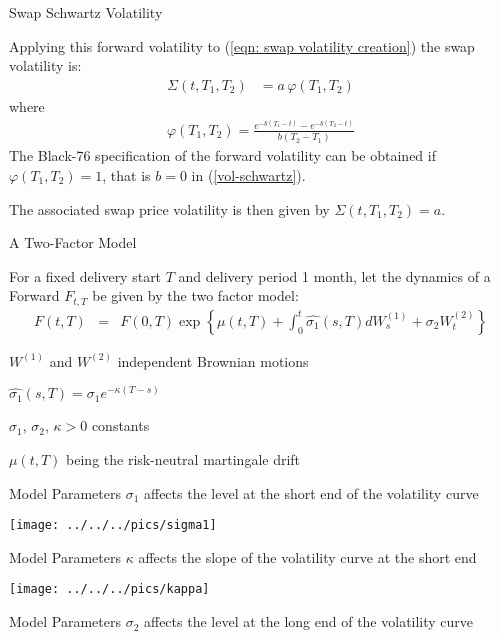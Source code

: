 

{Swap Schwartz Volatility}

Applying this forward volatility to (\ref{eqn: swap volatility creation}) the swap volatility is:
\begin{align}
\Sigma(t,T_1,T_2)&=a\,\varphi(T_1,T_2)
\end{align}
where
\begin{align}
\varphi(T_1,T_2)= \frac{e^{-b(T_1-t)}-e^{-b(T_2-t)}}{b(T_2-T_1)}
\label{volatility function varphi}
\end{align}
The Black-76 specification of the forward volatility can be obtained if $\varphi(T_1,T_2) =1$, that is $b=0$
in (\ref{vol-schwartz}).

The associated swap price volatility is then given by $\Sigma(t,T_1,T_2)=a$.

{A Two-Factor Model}


	For a fixed delivery start $T$ and delivery period 1 month, let the dynamics of a Forward $F_{t,T}$ be given by the two factor model:
\begin{eqnarray*}
F(t,T)& =&F(0,T)\exp\left\{\mu(t,T)  +\int_0^t\hat{\sigma_1}(s,T)dW_s^{(1)}+\sigma_2W_t^{(2)}\right\}
\end{eqnarray*}

	$W^{(1)}$ and $W^{(2)}$ independent Brownian motions

	$\hat{\sigma_1}(s,T)=\sigma_1e^{-\kappa(T-s)}$

	$\sigma_1$, $\sigma_2$, $\kappa>0$ constants

	$\mu(t,T)$ being the risk-neutral martingale drift


{Model Parameters}
$\sigma_1$ affects the level at the short end of the volatility curve

\begin{center}
\texttt{[image: ../../../pics/sigma1]}
\end{center}

{Model Parameters}
$\kappa$ affects the slope of the volatility curve at the short end

\begin{center}
\texttt{[image: ../../../pics/kappa]}
\end{center}

{Model Parameters}
$\sigma_2$ affects the level at the long end of the volatility curve

